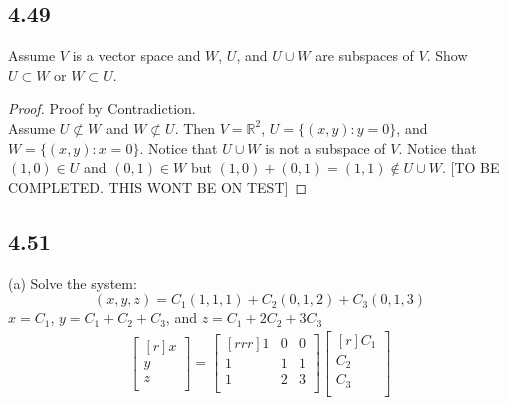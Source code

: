 \documentclass{report}
\theoremstyle{plain}
\theoremstyle{definition}
\theoremstyle{plain}
\begin{document}
\subsection{4.49}
Assume $V$ is a vector space and $W$, $U$, and $U \cup W$ are subspaces of $V$. Show $U \subset W$ or $W \subset U$.\\
\begin{proof}
Proof by Contradiction.\\
Assume $U \not\subset W$ and $W \not\subset U$. Then $V=\mathbb{R}^2$, $U=\{(x,y):y=0\}$, and $W=\{(x,y):x=0\}$. Notice that $U \cup W$ is not a subspace of $V$. Notice that $(1,0)\in U$ and $(0,1) \in W$ but $(1,0)+(0,1)=(1,1) \not\in U \cup W$. [TO BE COMPLETED. THIS WONT BE ON TEST]
\end{proof}

\subsection{4.51}
(a) Solve the system:\\
\[ (x,y,z)=C_1(1,1,1) + C_2(0,1,2)+C_3(0,1,3) \]
$x=C_1$, $y=C_1+C_2+C_3$, and $z=C_1+2C_2+3C_3$
\begin{align*}
\begin{bmatrix}[r]x\\y\\z\\ \end{bmatrix}
= \begin{bmatrix}[rrr]1&0&0\\1&1&1\\1&2&3\\ \end{bmatrix}
\begin{bmatrix}[r]C_1\\C_2\\C_3\\ \end{bmatrix}
\end{align*}
\end{document}
